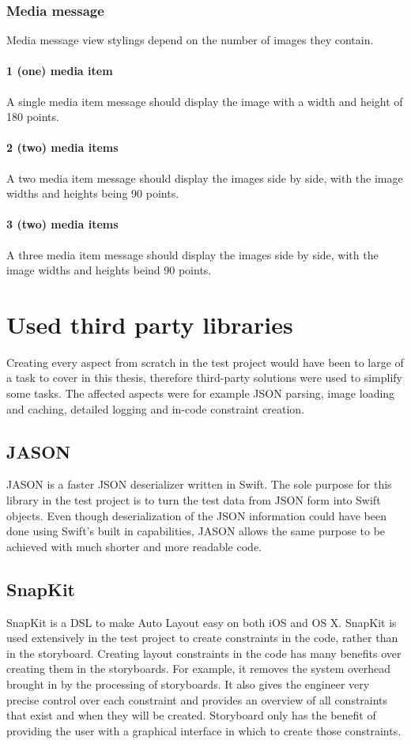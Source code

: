 \documentclass[a4paper,12pt]{article}
\begin{document}
\subsubsection{Media message}
Media message view stylings depend on the number of images they contain.

\paragraph{1 (one) media item}
A single media item message should display the image with a width and height of 180 points.

\paragraph{2 (two) media items}
A two media item message should display the images side by side, with the image widths and heights being 90 points.

\paragraph{3 (two) media items}
A three media item message should display the images side by side, with the image widths and heights beind 90 points.

\newpage
\section{Used third party libraries}
Creating every aspect from scratch in the test project would have been to large of a task to cover in this thesis,
therefore third-party solutions were used to simplify some tasks. The affected aspects were for example JSON parsing,
image loading and caching, detailed logging and in-code constraint creation.

\subsection{JASON}
JASON is a faster JSON deserializer written in Swift.\cite{JASON} The sole purpose for this library in the test
project is to turn the test data from JSON form into Swift objects. Even though deserialization of the JSON information
could have been done using Swift's built in capabilities, JASON allows the same purpose to be achieved with much shorter
and more readable code.

\subsection{SnapKit}
SnapKit is a DSL to make Auto Layout easy on both iOS and OS X.\cite{SnapKit} SnapKit is used extensively in the test
project to create constraints in the code, rather than in the storyboard. Creating layout constraints in the code has
many benefits over creating them in the storyboards. For example, it removes the system overhead brought in by the
processing of storyboards. It also gives the engineer very precise control over each constraint and provides an overview
of all constraints that exist and when they will be created. Storyboard only has the benefit of providing the user with
a graphical interface in which to create those constraints.
\end{document}
